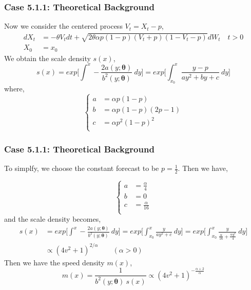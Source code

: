 \documentclass[aspectratio=169]{beamer}\usepackage[utf8]{inputenc}
\begin{document}
\begin{frame}\frametitle{ Case 5.1.1: Theoretical Background }
Now we consider the centered process $V_t= X_t - p$,
\begin{equation}
\begin{split}
dX_t &= -\theta V_t dt + \sqrt{2 \theta \alpha p(1-p) (V_t +p ) (1-V_t-p)} dW_t \quad t > 0 \\
X_0 & = x_0
\end{split}\label{main}
\end{equation}
We obtain the scale density $s(x)$,
\begin{equation}
s(x) = exp \Big[ \int^x - \frac{2  a(y; \bm{\theta})}{b^2 (y; \bm{\theta} )}\ dy \Big] = exp \Big[ \int^x_{x_0} \frac{y-p}{a y^2 + by +c}\ dy \Big]  
\end{equation}
where,
\begin{equation}
\begin{cases}
a&=  \alpha p(1-p)\\
b&=  \alpha p(1-p)(2p-1)\\
c&=  \alpha p^2(1-p)^2\\
\end{cases}
\end{equation}
\end{frame}



\begin{frame}\frametitle{ Case 5.1.1: Theoretical Background }
To simplfy, we choose the constant forecast to be $p=\frac{1}{2}$. Then we have,

\begin{equation}
\begin{cases}
a&=  \frac{\alpha}{4} \\
b&=  0 \\
c&=  \frac{\alpha}{16} \\
\end{cases}
\end{equation}
and the scale density becomes, 
\begin{equation}
\begin{split}
s(x) &= exp \Big[ \int^x - \frac{2  a(y; \bm{\theta})}{b^2 (y; \bm{\theta} )}\ dy \Big] = exp \Big[ \int^x_{x_0} \frac{y}{a y^2 +c}\ dy \Big] =exp \Big[ \int^x_{x_0} \frac{y}{\frac{\alpha }{16}+\frac{\alpha  y^2}{4}}\ dy \Big]\\
& \propto \left(4 v^2+1\right)^{2/\alpha } \quad \quad (\alpha >0)
\end{split}
\end{equation}
Then we have the speed density $m(x)$,
\begin{equation}
m(x) = \frac{1}{b^2 (y; \bm{\theta}) \  s(x)} \propto \left(4 v^2+1\right)^{-\frac{\alpha +2}{\alpha }}
\end{equation}
\end{frame}
\end{document}
